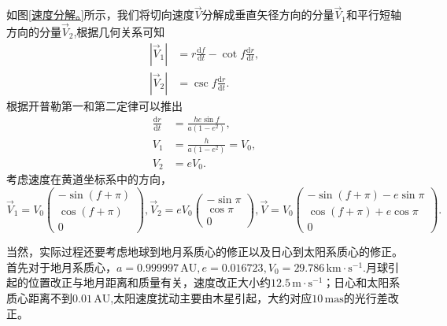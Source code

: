 \documentclass[11pt, a4paper, oneside]{ctexart}
\numberwithin{equation}{subsection}
\begin{document}
如图\ref{速度分解。}所示，我们将切向速度$\vec{V}$分解成垂直矢径方向的分量$\vec{V}_{1}$和平行短轴方向的分量$\vec{V}_{2}$,根据几何关系可知
\begin{align}
\left\vert{}\vec{V}_{1}\right\vert{}&=r\frac{\mathrm{d}f}{\mathrm{d}t}-\cot f\frac{\mathrm{d}r}{\mathrm{d}t},\\
\left\vert{}\vec{V}_{2}\right\vert{}&=\csc f\frac{\mathrm{d}r}{\mathrm{d}t}.
\end{align}
根据开普勒第一和第二定律可以推出
\begin{align}
\frac{\mathrm{d}r}{\mathrm{d}t}&=\frac{he\sin f}{a\left(1-e^2\right)},\\
V_1&=\frac{h}{a\left(1-e^2\right)}=V_0,\\
V_2&=eV_0.
\end{align}
考虑速度在黄道坐标系中的方向，
\begin{equation}
\vec V_1=V_0\begin{pmatrix}
-\sin\left(f+\pi\right)\\
\cos\left(f+\pi\right)\\
0
\end{pmatrix},
\vec V_2=eV_0\begin{pmatrix}
-\sin\pi\\
\cos\pi\\
0
\end{pmatrix},
\vec V=V_0\begin{pmatrix}
-\sin\left(f+\pi\right)-e\sin\pi\\
\cos\left(f+\pi\right)+e\cos\pi\\
0
\end{pmatrix}.
\end{equation}

当然，实际过程还要考虑地球到地月系质心的修正以及日心到太阳系质心的修正。首先对于地月系质心，$a=0.999997\,\mathrm{AU},e=0.016723,V_0=29.786\,\mathrm{km\cdot{}s^{-1}}$.月球引起的位置改正与地月距离和质量有关，速度改正大小约$12.5\,\mathrm{m\cdot{}s^{-1}}$；日心和太阳系质心距离不到$0.01\,\mathrm{AU}$,太阳速度扰动主要由木星引起，大约对应$10\,\mathrm{mas}$的光行差改正。
\end{document}
